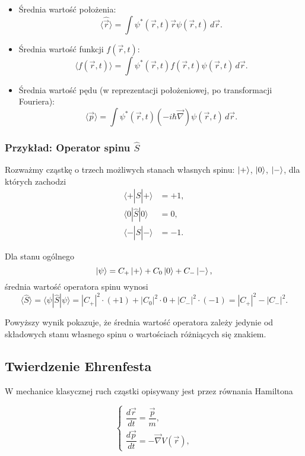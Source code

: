 \begin{itemize}
    \item Średnia wartość położenia:
    $$
    \langle \hat{\vec{r}} \rangle = \int \psi^*(\vec{r}, t) \vec{r} \psi(\vec{r}, t) \, d\vec{r}.
    $$

    \item Średnia wartość funkcji $f(\vec{r}, t)$:
    $$
    \langle f(\vec{r}, t) \rangle = \int \psi^*(\vec{r}, t) f(\vec{r}, t) \psi(\vec{r}, t) \, d\vec{r}.
    $$

    \item Średnia wartość pędu (w reprezentacji położeniowej, po transformacji Fouriera):
    $$
    \langle \vec{p} \rangle = \int \psi^*(\vec{r}, t) \left( -i\hbar \vec{\nabla} \right) \psi(\vec{r}, t) \, d\vec{r}.
    $$
\end{itemize}

\subsubsection*{Przykład: Operator spinu $\hat{S}$}

Rozważmy cząstkę o trzech możliwych stanach własnych spinu: $\ket{+}$, $\ket{0}$, $\ket{-}$, dla których zachodzi
\begin{align*}
\langle + | \hat{S} | + \rangle &= +1, \\
\langle 0 | \hat{S} | 0 \rangle &= 0, \\
\langle - | \hat{S} | - \rangle &= -1.
\end{align*}

Dla stanu ogólnego
$$
\ket{\psi} = C_+ \ket{+} + C_0 \ket{0} + C_- \ket{-},
$$
średnia wartość operatora spinu wynosi
$$
\langle \hat{S} \rangle = \langle \psi | \hat{S} | \psi \rangle = |C_+|^2 \cdot (+1) + |C_0|^2 \cdot 0 + |C_-|^2 \cdot (-1) = |C_+|^2 - |C_-|^2.
$$

Powyższy wynik pokazuje, że średnia wartość operatora zależy jedynie od składowych stanu własnego spinu o wartościach różniących się znakiem.

\subsection{Twierdzenie Ehrenfesta}

W mechanice klasycznej ruch cząstki opisywany jest przez równania Hamiltona

$$
\begin{cases}
    \dfrac{d \vec{r}}{dt} = \dfrac{\vec{p}}{m}, \\
    \dfrac{d \vec{p}}{dt} = -\vec{\nabla} V(\vec{r}),
\end{cases}
$$

